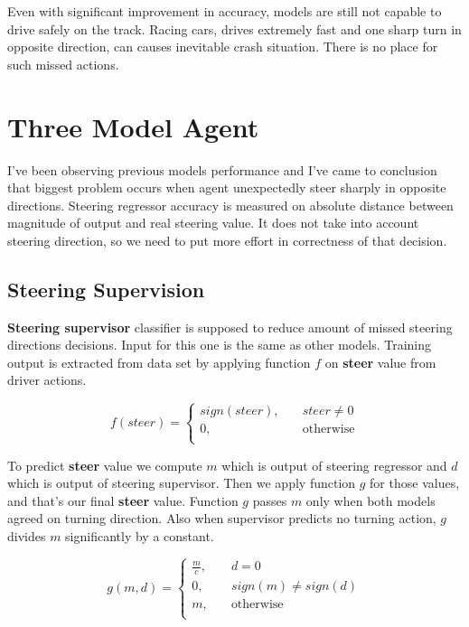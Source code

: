 \documentclass[declaration,shortabstract,english,inz]{iithesis}
\begin{document}
Even with significant improvement in accuracy, models are still not capable to drive safely on the track.
Racing cars, drives extremely fast and one sharp turn in opposite direction, can causes inevitable crash situation.
There is no place for such missed actions.
 

\section{Three Model Agent}

I've been observing previous models performance and I've came to conclusion that biggest problem occurs when agent unexpectedly steer sharply in opposite directions.
Steering regressor accuracy is measured on absolute distance between magnitude of output and real steering value.
It does not take into account steering direction, so we need to put more effort in correctness of that decision.

\subsection{Steering Supervision}


\textbf{Steering supervisor} classifier is supposed to reduce amount of missed steering directions decisions.
Input for this one is the same as other models.
Training output is extracted from data set by applying function $f$ on \textbf{steer} value from driver actions.

$$ f(steer) =  \begin{cases}
    sign(steer), &\quad steer\neq0 \\
    0, &\quad \text{otherwise} \\
  \end{cases}
 $$


To predict \textbf{steer} value we compute $m$ which is output of steering regressor and $d$ which is output of steering supervisor.
Then we apply function $g$ for those values, and that's our final \textbf{steer} value.
Function $g$ passes $m$ only when both models agreed on turning direction.
Also when supervisor predicts no turning action, $g$ divides $m$ significantly by a constant.

 $$ g(m, d) =  \begin{cases}
    \frac{m}{c},  &\quad d = 0 \\
    0, &\quad sign(m) \neq sign(d) \\
    m, &\quad \text{otherwise} \\
  \end{cases}
 $$
\end{document}
